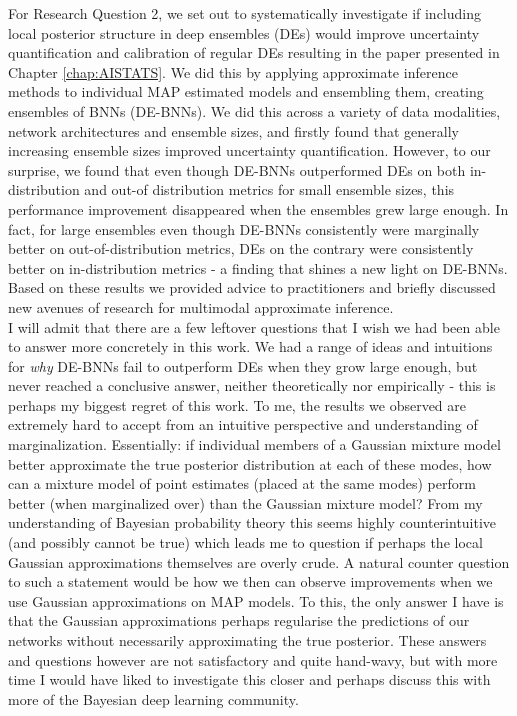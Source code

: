 \noindent For Research Question 2, we set out to systematically investigate if including local posterior structure in deep ensembles (DEs) would improve uncertainty quantification and calibration of regular DEs resulting in the paper presented in Chapter \ref{chap:AISTATS}. We did this by applying approximate inference methods to individual MAP estimated models and ensembling them, creating ensembles of BNNs (DE-BNNs). We did this across a variety of data modalities, network architectures and ensemble sizes, and firstly found that generally increasing ensemble sizes improved uncertainty quantification. However, to our surprise, we found that even though DE-BNNs outperformed DEs on both in-distribution and out-of distribution metrics for small ensemble sizes, this performance improvement disappeared when the ensembles grew large enough. In fact, for large ensembles even though DE-BNNs consistently were marginally better on out-of-distribution metrics, DEs on the contrary were consistently better on in-distribution metrics - a finding that shines a new light on DE-BNNs. Based on these results we provided advice to practitioners and briefly discussed new avenues of research for multimodal approximate inference. \\

\noindent I will admit that there are a few leftover questions that I wish we had been able to answer more concretely in this work. We had a range of ideas and intuitions for \textit{why} DE-BNNs fail to outperform DEs when they grow large enough, but never reached a conclusive answer, neither theoretically nor empirically - this is perhaps my biggest regret of this work. To me, the results we observed are extremely hard to accept from an intuitive perspective and understanding of marginalization. Essentially: if individual members of a Gaussian mixture model better approximate the true posterior distribution at each of these modes, how can a mixture model of point estimates (placed at the same modes) perform better (when marginalized over) than the Gaussian mixture model? From my understanding of Bayesian probability theory this seems highly counterintuitive (and possibly cannot be true) which leads me to question if perhaps the local Gaussian approximations themselves are overly crude. A natural counter question to such a statement would be how we then can observe improvements when we use Gaussian approximations on MAP models. To this, the only answer I have is that the Gaussian approximations perhaps regularise the predictions of our networks without necessarily approximating the true posterior. These answers and questions however are not satisfactory and quite hand-wavy, but with more time I would have liked to investigate this closer and perhaps discuss this with more of the Bayesian deep learning community.\\

